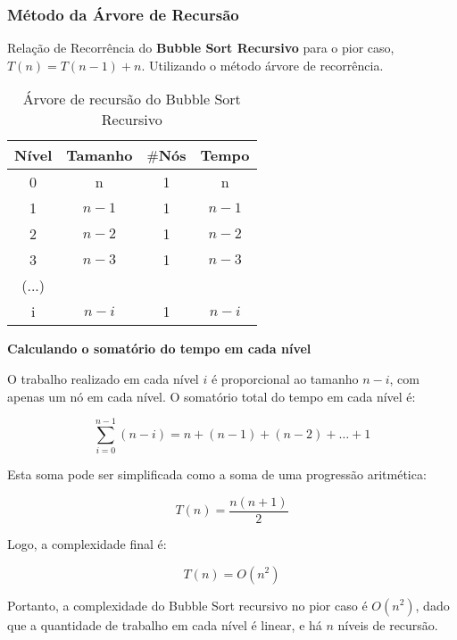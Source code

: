 \subsubsection{Método da Árvore de Recursão}

Relação de Recorrência do \textbf{Bubble Sort Recursivo} para o pior caso, \( T(n) = T(n - 1) + n \). Utilizando o método árvore de recorrência.

\begin{table}[ht!]
    \centering
    \begin{tabular}{|c|c|c|c|}
    \hline
    \textbf{Nível} & \textbf{Tamanho} & $\#$\textbf{Nós} & \textbf{Tempo} \\ \hline
     0 & n & 1 & n \\ \hline
     1 & $n - 1$ & 1 & $n - 1$ \\ \hline
     2 & $n - 2$ & 1 & $n - 2$ \\ \hline
     3 & $n - 3$ & 1 & $n - 3$ \\ \hline
     (...) & & & \\ \hline
     i & $n - i$ & 1 & $n - i$ \\ \hline 
    \end{tabular}  
    \caption{Árvore de recursão do Bubble Sort Recursivo}
\end{table}

\textbf{Calculando o somatório do tempo em cada nível}

O trabalho realizado em cada nível \(i\) é proporcional ao tamanho \( n - i \), com apenas um nó em cada nível. O somatório total do tempo em cada nível é:

\[
\sum_{i=0}^{n-1} (n - i) = n + (n-1) + (n-2) + \dots + 1
\]

Esta soma pode ser simplificada como a soma de uma progressão aritmética:

\[
T(n) = \frac{n(n+1)}{2}
\]

Logo, a complexidade final é:

\[
T(n) = O(n^2)
\]

Portanto, a complexidade do Bubble Sort recursivo no pior caso é \( O(n^2) \), dado que a quantidade de trabalho em cada nível é linear, e há \( n \) níveis de recursão.
